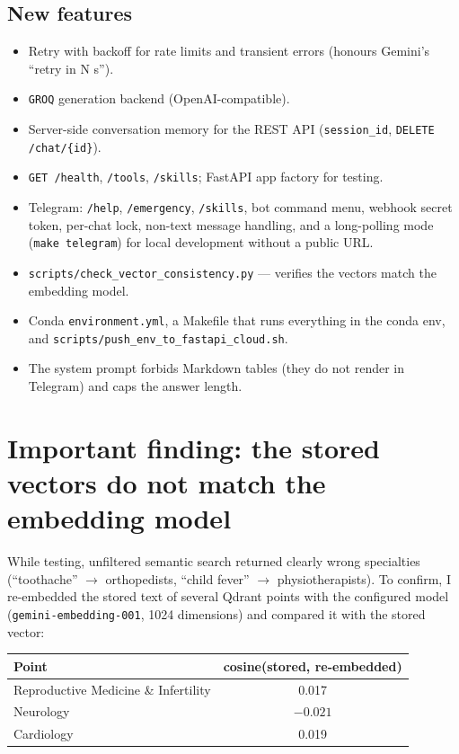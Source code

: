 \documentclass[11pt,a4paper]{article}
\newcommand{\code}[1]{\texttt{#1}}
\begin{document}
\subsection{New features}
\begin{itemize}
  \item Retry with backoff for rate limits and transient errors (honours Gemini's ``retry in N s'').
  \item \code{GROQ} generation backend (OpenAI-compatible).
  \item Server-side conversation memory for the REST API (\code{session\_id}, \code{DELETE /chat/\{id\}}).
  \item \code{GET /health}, \code{/tools}, \code{/skills}; FastAPI app factory for testing.
  \item Telegram: \code{/help}, \code{/emergency}, \code{/skills}, bot command menu, webhook secret token, per-chat lock, non-text message handling, and a long-polling mode (\code{make telegram}) for local development without a public URL.
  \item \code{scripts/check\_vector\_consistency.py} --- verifies the vectors match the embedding model.
  \item Conda \code{environment.yml}, a Makefile that runs everything in the conda env, and \code{scripts/push\_env\_to\_fastapi\_cloud.sh}.
  \item The system prompt forbids Markdown tables (they do not render in Telegram) and caps the answer length.
\end{itemize}

\section{Important finding: the stored vectors do not match the embedding model}\label{sec:embeddings}

While testing, unfiltered semantic search returned clearly wrong specialties (``toothache'' $\rightarrow$ orthopedists, ``child fever'' $\rightarrow$ physiotherapists). To confirm, I re-embedded the stored text of several Qdrant points with the configured model (\code{gemini-embedding-001}, 1024 dimensions) and compared it with the stored vector:

\begin{center}
\begin{tabular}{@{}lc@{}}
\toprule
\textbf{Point} & \textbf{cosine(stored, re-embedded)} \\
\midrule
Reproductive Medicine \& Infertility & 0.017 \\
Neurology & $-0.021$ \\
Cardiology & 0.019 \\
\bottomrule
\end{tabular}
\end{center}
\end{document}
